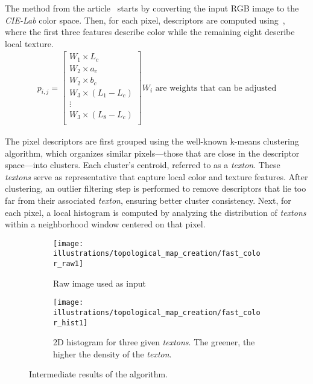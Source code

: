 The method from the article~\textcite{rufus_blas_fast_2008} starts by converting the input RGB image to the \textit{CIE-Lab} color space.
Then, for each pixel, descriptors are computed using~, where the first three features
describe color while the remaining eight describe local texture.
\begin{align}
    \label{eq:fast_color:descriptor}
    p_{i,j} = \begin{bmatrix}
                  W_1 \times L_c         \\
                  W_2 \times a_c         \\
                  W_2 \times b_c         \\
                  W_3 \times (L_1 - L_c) \\
                  \vdots                 \\
                  W_3 \times (L_8 - L_c) \\
    \end{bmatrix} \text{$W_i$ are weights that can be adjusted}
\end{align}

The pixel descriptors are first grouped using the well-known k-means clustering algorithm, which organizes similar
pixels---those that are close in the descriptor space---into clusters.
Each cluster's centroid, referred to as a \textit{texton}.
These \textit{textons} serve as representative that capture local color and texture features.
After clustering, an outlier filtering step is performed to remove descriptors that lie too far from their associated
\textit{texton}, ensuring better cluster consistency.
Next, for each pixel, a local histogram is computed by analyzing the distribution of \textit{textons} within a neighborhood
window centered on that pixel.

\begin{figure}[ht!]
    \centering
    \begin{subfigure}[t]{.29\textwidth}
        \texttt{[image: illustrations/topological\_map\_creation/fast\_color\_raw1]}
        \caption{Raw image used as input}
        \label{fig:fast_color:raw_image}
    \end{subfigure}
    \hfill
    \begin{subfigure}[t]{.69\textwidth}
        \texttt{[image: illustrations/topological\_map\_creation/fast\_color\_hist1]}
        \caption{2D histogram for three given \textit{textons}. The greener, the higher the density of the \textit{texton}.}
        \label{fig:fast_color:histograms}
    \end{subfigure}
    \caption{Intermediate results of the algorithm.}
    \label{fig:fast_color:intermediate_histograms}
\end{figure}


